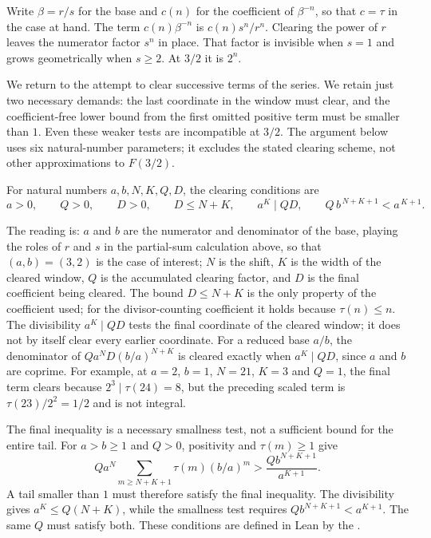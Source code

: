 \documentclass[11pt]{article}
\begin{document}
Write $\beta=r/s$ for the base and $c(n)$ for the coefficient of $\beta^{-n}$,
so that $c=\tau$ in the case at hand.  The term $c(n)\beta^{-n}$ is
$c(n)s^{n}/r^{n}$.  Clearing the
power of $r$ leaves the numerator factor $s^{n}$ in place.  That factor is
invisible when $s=1$ and grows geometrically when $s\ge2$.  At $3/2$ it is
$2^{n}$.


We return to the attempt to clear successive terms of the series.
We retain just two necessary demands: the last coordinate in the
window must clear, and the coefficient-free lower bound from the
first omitted positive term must be smaller than $1$. Even these
weaker tests are incompatible at
$3/2$. The argument below uses six natural-number parameters;
it excludes the stated clearing scheme, not other approximations
to $F(3/2)$.

\begin{definition}\label{long1049:def:corridor}
For natural numbers $a,b,N,K,Q,D$, the clearing conditions are
\[
 a>0,\qquad Q>0,\qquad D>0,\qquad D\le N+K,\qquad
 a^{K}\mid QD,\qquad Q\,b^{\,N+K+1}<a^{\,K+1}.
\]
\end{definition}

\noindent The reading is: $a$ and $b$ are the numerator and denominator of the
base, playing the roles of $r$ and $s$ in the partial-sum calculation
above, so that
$(a,b)=(3,2)$ is the case of interest;
$N$ is the shift, $K$ is the width of the cleared window, $Q$ is the
accumulated clearing factor, and $D$ is the final coefficient being cleared.
The bound $D\le N+K$ is the only property of the coefficient used; for the
divisor-counting coefficient it holds because $\tau(n)\le n$.  The divisibility $a^{K}\mid QD$ tests the final coordinate of the cleared
window; it does not by itself clear every earlier coordinate. For a
reduced base $a/b$, the denominator of
$Qa^N D(b/a)^{N+K}$ is cleared exactly when $a^K\mid QD$, since
$a$ and $b$ are coprime. For example, at $a=2$, $b=1$,
$N=21$, $K=3$ and $Q=1$, the final term clears because
$2^3\mid\tau(24)=8$, but the preceding scaled term is
$\tau(23)/2^2=1/2$ and is not integral.

The final inequality is a necessary smallness test, not a sufficient
bound for the entire tail. For $a>b\ge1$ and $Q>0$, positivity and
$\tau(m)\ge1$ give
\[
 Q a^N\sum_{m\ge N+K+1}\tau(m)(b/a)^m
 >\frac{Qb^{N+K+1}}{a^{K+1}}.
\]
A tail smaller than $1$ must therefore satisfy the final inequality.
The divisibility gives $a^K\le Q(N+K)$, while the smallness test requires
$Qb^{N+K+1}<a^{K+1}$. The same $Q$ must satisfy both. These
conditions are defined in Lean by the
.
\end{document}
